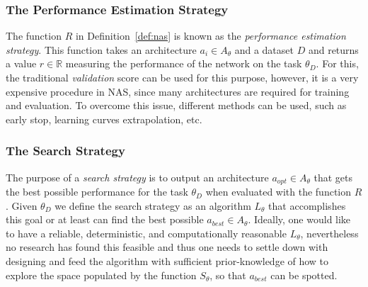 
\subsubsection*{The Performance Estimation Strategy}

The function $R$ in Definition~\ref{def:nas} is known as the \textit{performance estimation strategy}. This function takes an architecture $a_i \in A_\theta$ and a dataset $D$ and returns a value $r \in \mathbb{R}$ measuring the performance of the network on the task $\theta_D$. For this, the traditional \textit{validation} score can be used for this purpose, however, it is a very expensive procedure in NAS, since many architectures are required for training and evaluation. To overcome this issue, different methods can be used, such as early stop, learning curves extrapolation, etc.

\subsubsection*{The Search Strategy}

The purpose of a \textit{search strategy} is to output an architecture $a_{opt} \in A_\theta$ that gets the best possible performance for the task $\theta_D$ when evaluated with the function $R$. Given $\theta_D$ we define the search strategy as an algorithm $L_\theta$ that accomplishes this goal or at least can find the best possible $a_{best} \in A_\theta$. Ideally, one would like to have a reliable, deterministic, and computationally reasonable $L_\theta$, nevertheless no research has found this feasible and thus one needs to settle down with designing and feed the algorithm with sufficient prior-knowledge of how to explore the space populated by the function $S_\theta$, so that $a_{best}$ can be spotted.




